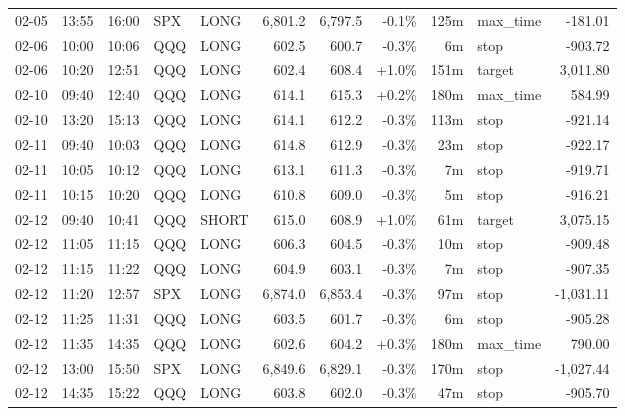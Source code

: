 \documentclass[11pt,a4paper,twoside]{article}
\begin{document}
\begin{center}
\begin{longtable}{>{\color{txtmain}}l l l l l r r r r >{\color{txtmain}}l r}
02-05 & 13:55 & 16:00 & SPX & LONG & 6,801.2 & 6,797.5 & \textcolor{lossred}{-0.1\%} & 125m & max\_time & \textcolor{lossred}{-181.01} \\
02-06 & 10:00 & 10:06 & QQQ & LONG & 602.5 & 600.7 & \textcolor{lossred}{-0.3\%} & 6m & stop & \textcolor{lossred}{-903.72} \\
02-06 & 10:20 & 12:51 & QQQ & LONG & 602.4 & 608.4 & \textcolor{wingreen}{+1.0\%} & 151m & target & \textcolor{wingreen}{3,011.80} \\
02-10 & 09:40 & 12:40 & QQQ & LONG & 614.1 & 615.3 & \textcolor{wingreen}{+0.2\%} & 180m & max\_time & \textcolor{wingreen}{584.99} \\
02-10 & 13:20 & 15:13 & QQQ & LONG & 614.1 & 612.2 & \textcolor{lossred}{-0.3\%} & 113m & stop & \textcolor{lossred}{-921.14} \\
02-11 & 09:40 & 10:03 & QQQ & LONG & 614.8 & 612.9 & \textcolor{lossred}{-0.3\%} & 23m & stop & \textcolor{lossred}{-922.17} \\
02-11 & 10:05 & 10:12 & QQQ & LONG & 613.1 & 611.3 & \textcolor{lossred}{-0.3\%} & 7m & stop & \textcolor{lossred}{-919.71} \\
02-11 & 10:15 & 10:20 & QQQ & LONG & 610.8 & 609.0 & \textcolor{lossred}{-0.3\%} & 5m & stop & \textcolor{lossred}{-916.21} \\
02-12 & 09:40 & 10:41 & QQQ & SHORT & 615.0 & 608.9 & \textcolor{wingreen}{+1.0\%} & 61m & target & \textcolor{wingreen}{3,075.15} \\
02-12 & 11:05 & 11:15 & QQQ & LONG & 606.3 & 604.5 & \textcolor{lossred}{-0.3\%} & 10m & stop & \textcolor{lossred}{-909.48} \\
02-12 & 11:15 & 11:22 & QQQ & LONG & 604.9 & 603.1 & \textcolor{lossred}{-0.3\%} & 7m & stop & \textcolor{lossred}{-907.35} \\
02-12 & 11:20 & 12:57 & SPX & LONG & 6,874.0 & 6,853.4 & \textcolor{lossred}{-0.3\%} & 97m & stop & \textcolor{lossred}{-1,031.11} \\
02-12 & 11:25 & 11:31 & QQQ & LONG & 603.5 & 601.7 & \textcolor{lossred}{-0.3\%} & 6m & stop & \textcolor{lossred}{-905.28} \\
02-12 & 11:35 & 14:35 & QQQ & LONG & 602.6 & 604.2 & \textcolor{wingreen}{+0.3\%} & 180m & max\_time & \textcolor{wingreen}{790.00} \\
02-12 & 13:00 & 15:50 & SPX & LONG & 6,849.6 & 6,829.1 & \textcolor{lossred}{-0.3\%} & 170m & stop & \textcolor{lossred}{-1,027.44} \\
02-12 & 14:35 & 15:22 & QQQ & LONG & 603.8 & 602.0 & \textcolor{lossred}{-0.3\%} & 47m & stop & \textcolor{lossred}{-905.70} \\

\end{longtable}
\end{center}
\end{document}
